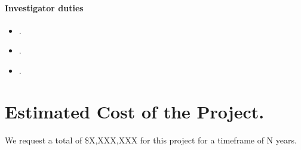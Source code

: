 \documentclass[11pt,a4paper]{article}
\begin{document}
\paragraph*{Investigator duties}
\begin{itemize}[topsep=0pt,itemsep=-0.5ex,partopsep=1ex,parsep=1ex,leftmargin=*]
    \item[].
    \item[].
    \item[].
\end{itemize}


\section*{Estimated Cost of the Project.} 
We request a total of \$X,XXX,XXX for this project for a timeframe of N years.
\end{document}
